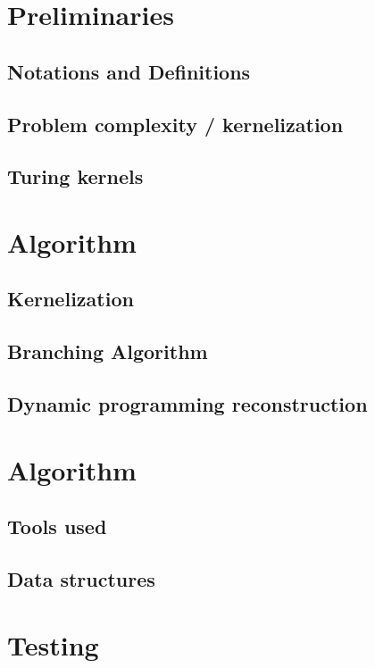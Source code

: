 \documentclass[a4paper, 12pt]{article}
\begin{document}
    \section{Preliminaries}
    \subsection{Notations and Definitions}
    \subsection{Problem complexity / kernelization}
    \subsection{Turing kernels}
    
    \section{Algorithm}
    \subsection{Kernelization}
    \subsection{Branching Algorithm}
    \subsection{Dynamic programming reconstruction}
    
    \section{Algorithm}
    \subsection{Tools used}
    \subsection{Data structures}
    
    \section{Testing}
\end{document}
